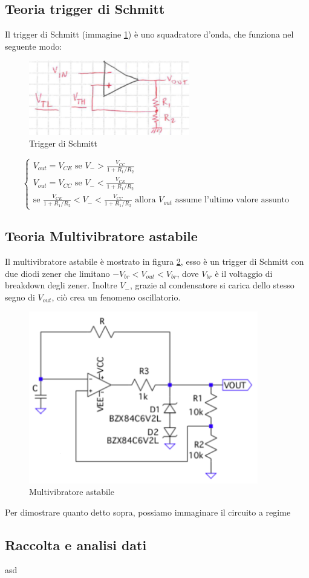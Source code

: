\documentclass{article}
\begin{document}
		\subsection{Teoria trigger di Schmitt}
			Il trigger di Schmitt (immagine \ref{fig:smith}) è uno squadratore d'onda, che funziona nel seguente modo:\newline
			\begin{figure}
				\label{fig:smith}
				\centering
				\includegraphics[width=70mm]{immagini/smitha.png}
				\caption{Trigger di Schmitt}
			\end{figure}
			\begin{equation}
				\begin{cases}
					V_{out}=V_{CE}\textrm{ se }V_->\frac{V_{CC}}{1+R_1/R_2}\\
					V_{out}=V_{CC}\textrm{ se }V_-<\frac{V_{CE}}{1+R_1/R_2}\\
					\textrm{se }\frac{V_{CE}}{1+R_1/R_2}<V_-<\frac{V_{CC}}{1+R_1/R_2}\textrm{ allora }V_{out}\textrm{ assume l'ultimo valore assunto}
				\end{cases}
			\end{equation}
		\subsection{Teoria Multivibratore astabile}
			Il multivibratore astabile è mostrato in figura \ref{fig:multivibratore}, esso è un trigger di Schmitt con due diodi zener che limitano $-V_{br}<V_{out}<V_{br}$, dove $V_{br}$ è il voltaggio di breakdown degli zener. Inoltre $V_-$, grazie al condensatore si carica dello stesso segno di $V_{out}$, ciò crea un fenomeno oscillatorio.
			\begin{figure}
				\label{fig:multivibratore}
				\centering
				\includegraphics[width=100mm]{immagini/multivibratore.png}
				\caption{Multivibratore astabile}
			\end{figure}
			Per dimostrare quanto detto sopra, possiamo immaginare il circuito a regime
		\subsection{Raccolta e analisi dati}
		asd
\end{document}

